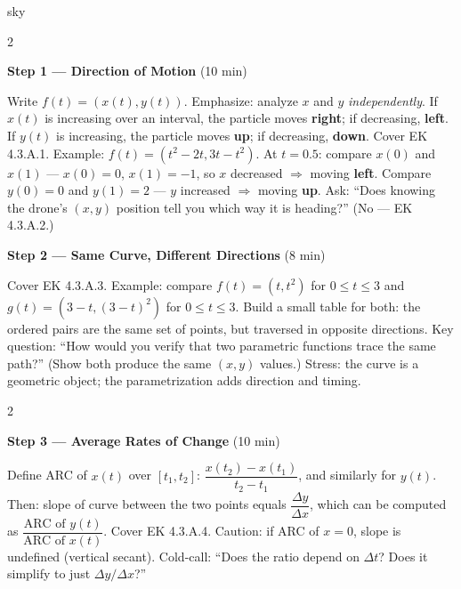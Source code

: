 \documentclass[10pt]{article}
\begin{document}
\begin{skillbox}{sky}
\begin{multicols}{2}

\textbf{Step 1 --- Direction of Motion} (10 min)

Write $f(t) = (x(t), y(t))$. Emphasize: analyze $x$ and $y$
\emph{independently}. If $x(t)$ is increasing over an interval, the
particle moves \textbf{right}; if decreasing, \textbf{left}. If $y(t)$
is increasing, the particle moves \textbf{up}; if decreasing,
\textbf{down}. Cover EK 4.3.A.1. Example: $f(t) = (t^2 - 2t, 3t - t^2)$.
At $t = 0.5$: compare $x(0)$ and $x(1)$ --- $x(0) = 0$, $x(1) = -1$,
so $x$ decreased $\Rightarrow$ moving \textbf{left}. Compare $y(0) = 0$
and $y(1) = 2$ --- $y$ increased $\Rightarrow$ moving \textbf{up}. Ask:
``Does knowing the drone's $(x, y)$ position tell you which way it is
heading?'' (No --- EK 4.3.A.2.)

\columnbreak

\textbf{Step 2 --- Same Curve, Different Directions} (8 min)

Cover EK 4.3.A.3. Example: compare $f(t) = (t, t^2)$ for $0 \le t \le 3$
and $g(t) = (3 - t, (3-t)^2)$ for $0 \le t \le 3$. Build a small table
for both: the ordered pairs are the same set of points, but traversed in
opposite directions. Key question: ``How would you verify that two
parametric functions trace the same path?'' (Show both produce the same
$(x, y)$ values.) Stress: the curve is a geometric object; the
parametrization adds direction and timing.

\end{multicols}

\begin{multicols}{2}

\textbf{Step 3 --- Average Rates of Change} (10 min)

Define ARC of $x(t)$ over $[t_1, t_2]$:
$\dfrac{x(t_2) - x(t_1)}{t_2 - t_1}$, and similarly for $y(t)$.
Then: slope of curve between the two points equals
$\dfrac{\Delta y}{\Delta x}$, which can be computed as
$\dfrac{\text{ARC of }y(t)}{\text{ARC of }x(t)}$.
Cover EK 4.3.A.4. Caution: if ARC of $x = 0$, slope is undefined
(vertical secant). Cold-call: ``Does the ratio depend on $\Delta t$?
Does it simplify to just $\Delta y / \Delta x$?''

\columnbreak


\end{multicols}
\end{skillbox}
\end{document}
